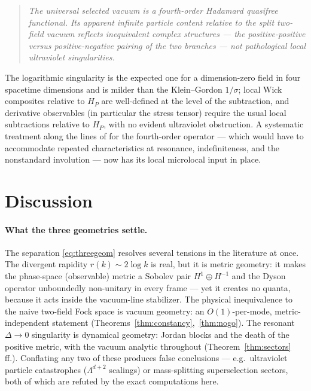 \documentclass[11pt]{article}
\theoremstyle{definition}
\theoremstyle{remark}
\begin{document}
\begin{quote}
\emph{The universal selected vacuum is a fourth-order Hadamard quasifree
functional.  Its apparent infinite particle content relative to the split
two-field vacuum reflects inequivalent complex structures --- the
positive-positive versus positive-negative pairing of the two branches
--- not pathological local ultraviolet singularities.}
\end{quote}

The logarithmic singularity is the expected one for a dimension-zero
field in four spacetime dimensions and is milder than the Klein--Gordon
$1/\sigma$; local Wick composites relative to $H_P$ are well-defined at
the level of the subtraction, and derivative observables (in particular
the stress tensor) require the usual local subtractions relative to
$H_P$, with no evident ultraviolet obstruction.  A systematic treatment
along the lines of \cite{Radzikowski,BrunettiFredenhagen,HollandsWald}
for the fourth-order operator --- which would have to accommodate
repeated characteristics at resonance, indefiniteness, and the
nonstandard involution --- now has its local microlocal input in place.

\section{Discussion}\label{sec:discussion}

\paragraph{What the three geometries settle.}
The separation \eqref{eq:threegeom} resolves several tensions in the
literature at once.  The divergent rapidity $r(k)\sim2\log k$ is real,
but it is metric geometry: it makes the phase-space (observable) metric a
Sobolev pair $H^1\oplus H^{-1}$ \cite{companion2} and the Dyson operator
unboundedly non-unitary in every frame --- yet it creates no quanta,
because it acts inside the vacuum-line stabilizer.  The physical
inequivalence to the naive two-field Fock space is vacuum geometry: an
$O(1)$-per-mode, metric-independent statement
(Theorems~\ref{thm:constancy},~\ref{thm:nogo}).  The resonant
$\Delta\to0$ singularity is dynamical geometry: Jordan blocks and the
death of the positive metric, with the vacuum analytic throughout
(Theorem~\ref{thm:sectors} ff.).  Conflating any two of these produces
false conclusions --- e.g.\ ultraviolet particle catastrophes
($\Lambda^{d+2}$ scalings) or mass-splitting superselection sectors, both
of which are refuted by the exact computations here.
\end{document}
